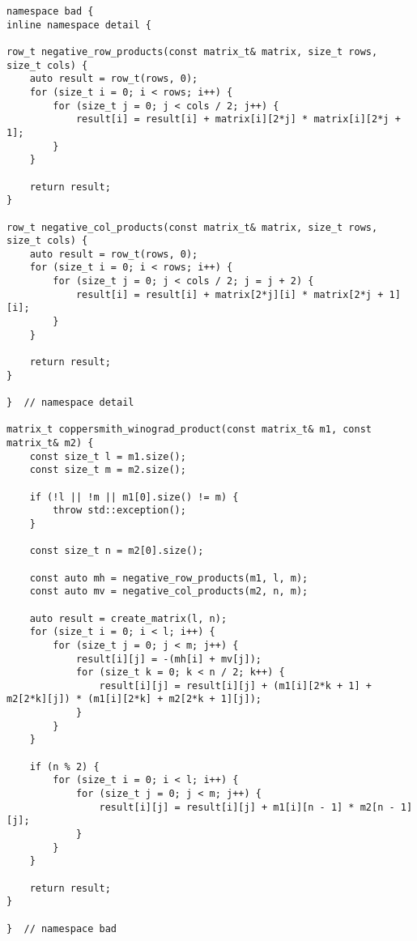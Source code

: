\begin{lstlisting}[caption={Алгоритм Копперсмита — Винограда},label={lst:bad_winograd},style={cpp}]
namespace bad {
inline namespace detail {

row_t negative_row_products(const matrix_t& matrix, size_t rows, size_t cols) {
	auto result = row_t(rows, 0);
	for (size_t i = 0; i < rows; i++) {
		for (size_t j = 0; j < cols / 2; j++) {
			result[i] = result[i] + matrix[i][2*j] * matrix[i][2*j + 1];
		}
	}

	return result;
}

row_t negative_col_products(const matrix_t& matrix, size_t rows, size_t cols) {
	auto result = row_t(rows, 0);
	for (size_t i = 0; i < rows; i++) {
		for (size_t j = 0; j < cols / 2; j = j + 2) {
			result[i] = result[i] + matrix[2*j][i] * matrix[2*j + 1][i];
		}
	}

	return result;
}

}  // namespace detail

matrix_t coppersmith_winograd_product(const matrix_t& m1, const matrix_t& m2) {
	const size_t l = m1.size();
	const size_t m = m2.size();

	if (!l || !m || m1[0].size() != m) {
		throw std::exception();
	}

	const size_t n = m2[0].size();

	const auto mh = negative_row_products(m1, l, m);
	const auto mv = negative_col_products(m2, n, m);

	auto result = create_matrix(l, n);
	for (size_t i = 0; i < l; i++) {
		for (size_t j = 0; j < m; j++) {
			result[i][j] = -(mh[i] + mv[j]);
			for (size_t k = 0; k < n / 2; k++) {
				result[i][j] = result[i][j] + (m1[i][2*k + 1] + m2[2*k][j]) * (m1[i][2*k] + m2[2*k + 1][j]);
			}
		}
	}

	if (n % 2) {
		for (size_t i = 0; i < l; i++) {
			for (size_t j = 0; j < m; j++) {
				result[i][j] = result[i][j] + m1[i][n - 1] * m2[n - 1][j];
			}
		}
	}

	return result;
}

}  // namespace bad
\end{lstlisting}

